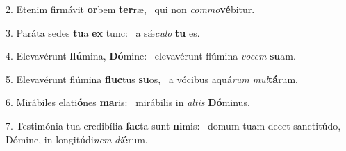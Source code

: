 2. Etenim firmávit \textbf{or}bem \textbf{ter}ræ, \ast\  qui non \textit{com}\textit{mo}\textbf{vé}bitur.\

3. Paráta sedes \textbf{tu}a \textbf{ex} tunc: \ast\  a sǽ\textit{cu}\textit{lo} \textbf{tu} es.\

4. Elevavérunt \textbf{flú}mina, \textbf{Dó}mine: \ast\  elevavérunt flúmina \textit{vo}\textit{cem} \textbf{su}am.\

5. Elevavérunt flúmina \textbf{fluc}tus \textbf{su}os, \ast\  a vócibus aquá\textit{rum} \textit{mul}\textbf{tá}rum.\

6. Mirábiles elati\textbf{ó}nes \textbf{ma}ris: \ast\  mirábilis in \textit{al}\textit{tis} \textbf{Dó}minus.\

7. Testimónia tua credibília \textbf{fac}ta sunt \textbf{ni}mis: \ast\  domum tuam decet sanctitúdo, Dómine, in longitúdi\textit{nem} \textit{di}\textbf{é}rum.\

